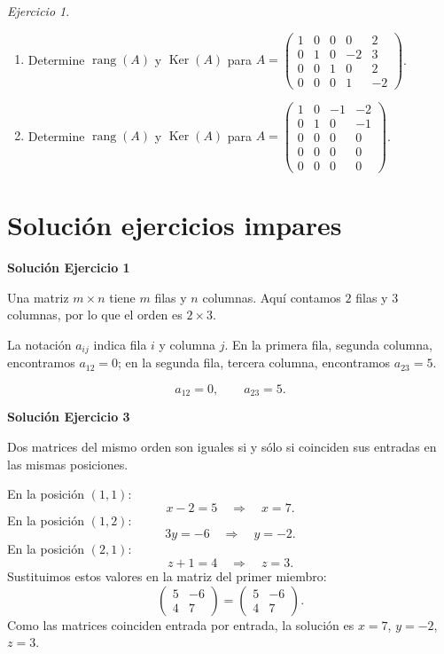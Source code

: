 \documentclass[12pt]{article}
\theoremstyle{remark}
\newtheorem{Ejer}[definicion]{Ejercicio}
\newcommand{\rang}{\operatorname{rang}}
\newcommand{\Ker}{\operatorname{Ker}}
\begin{document}
\begin{Ejer}
\begin{enumerate}[resume=banco]
\item Determine $\rang(A)$ y $\Ker(A)$ para $A=\begin{pmatrix}1&0&0&0&2\\0&1&0&-2&3\\0&0&1&0&2\\0&0&0&1&-2\end{pmatrix}$.

\item Determine $\rang(A)$ y $\Ker(A)$ para $A=\begin{pmatrix}1&0&-1&-2\\0&1&0&-1\\0&0&0&0\\0&0&0&0\\0&0&0&0\end{pmatrix}$.
\end{enumerate}
\end{Ejer}

\clearpage
\section{Solución ejercicios impares}

\par\bigskip\noindent\textbf{Solución Ejercicio 1}\par\nobreak
Una matriz $m\times n$ tiene $m$ filas y $n$ columnas. Aquí contamos $2$ filas y $3$ columnas, por lo que el orden es $\boxed{2\times3}$.

La notación $a_{ij}$ indica fila $i$ y columna $j$. En la primera fila, segunda columna, encontramos $a_{12}=0$; en la segunda fila, tercera columna, encontramos $a_{23}=5$.

\[
\boxed{a_{12}=0,\qquad a_{23}=5}.
\]

\par\bigskip\noindent\textbf{Solución Ejercicio 3}\par\nobreak
Dos matrices del mismo orden son iguales si y sólo si coinciden sus entradas en las mismas posiciones.

En la posición $(1,1)$:
\[
x - 2=5\quad\Longrightarrow\quad x=7.
\]
En la posición $(1,2)$:
\[
3 y=-6\quad\Longrightarrow\quad y=-2.
\]
En la posición $(2,1)$:
\[
z + 1=4\quad\Longrightarrow\quad z=3.
\]
Sustituimos estos valores en la matriz del primer miembro:
\[
\begin{pmatrix}5&-6\\4&7\end{pmatrix}=\begin{pmatrix}5&-6\\4&7\end{pmatrix}.
\]
Como las matrices coinciden entrada por entrada, la solución es $x=7$, $y=-2$, $z=3$.
\end{document}
